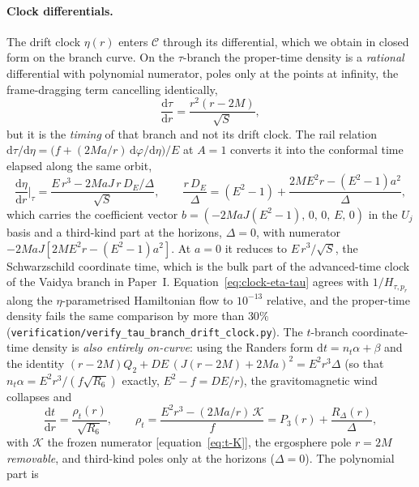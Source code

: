 \documentclass[12pt]{iopart}
\theoremstyle{plain}
\theoremstyle{definition}
\theoremstyle{remark}
\newcommand{\dd}{\mathrm{d}}
\begin{document}
\paragraph{Clock differentials.} The drift clock $\eta(r)$ enters $\mathcal{C}$ through its
differential, which we obtain in closed form on the branch curve. On the
$\tau$-branch the proper-time density is a \emph{rational} differential with polynomial
numerator, poles only at the points at infinity, the frame-dragging term cancelling identically,
\begin{equation}
    \frac{\dd\tau}{\dd r}=\frac{r^2(r-2M)}{\sqrt{S}},
    \label{eq:clock-tau}
\end{equation}
but it is the \emph{timing} of that branch and not its drift clock. The rail
relation $\dd\tau/\dd\eta=\big(f+(2Ma/r)\,\dd\varphi/\dd\eta\big)/E$ at $A=1$
converts it into the conformal time elapsed along the same orbit,
\begin{equation}
    \frac{\dd\eta}{\dd r}\bigg|_{\tau}
      =\frac{E\,r^3-2MaJ\,r\,D_E/\Delta}{\sqrt{S}},\qquad
    \frac{r\,D_E}{\Delta}=(E^2-1)+\frac{2ME^2r-(E^2-1)a^2}{\Delta},
    \label{eq:clock-eta-tau}
\end{equation}
which carries the coefficient vector $b=(-2MaJ(E^2-1),\,0,\,0,\,E,\,0)$ in the $U_j$ basis and a
third-kind part at the horizons, $\Delta=0$, with numerator
$-2MaJ[2ME^2r-(E^2-1)a^2]$. At $a=0$ it reduces to $E\,r^3/\sqrt S$, the
Schwarzschild coordinate time, which is the bulk part of the advanced-time clock
of the Vaidya branch in Paper~I. Equation~\eqref{eq:clock-eta-tau} agrees with
$1/H_{\tau,p_r}$ along the $\eta$-parametrised Hamiltonian flow to
$10^{-13}$ relative, and the proper-time density fails the same comparison by more than $30\%$
(\texttt{verification/verify\_tau\_branch\_drift\_clock.py}). The
$t$-branch coordinate-time density is \emph{also entirely on-curve}: using the
Randers form $\dd t=n_t\alpha+\beta$ and the identity
$(r-2M)Q_2+DE\,(J(r-2M)+2Ma)^2=E^2r^3\Delta$ (so that $n_t\alpha=E^2r^3/(f\sqrt{R_6})$
exactly, $E^2-f=DE/r$), the gravitomagnetic wind collapses and
\begin{equation}
    \frac{\dd t}{\dd r}=\frac{\rho_t(r)}{\sqrt{R_6}},\qquad
    \rho_t=\frac{E^2r^3-(2Ma/r)\,\mathcal K}{f}
          =P_3(r)+\frac{R_\Delta(r)}{\Delta},
    \label{eq:clock-t}
\end{equation}
with $\mathcal K$ the frozen numerator [equation~\eqref{eq:t-K}], the ergosphere pole
$r=2M$ \emph{removable}, and third-kind poles only at the horizons ($\Delta=0$). The
polynomial part is
\end{document}
